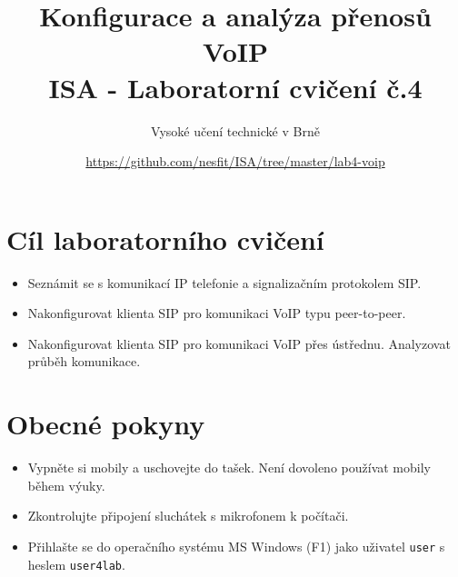 \documentclass[a4paper,11pt]{article}
\title{Konfigurace a analýza přenosů VoIP\\
{\bf\large ISA - Laboratorní cvičení č.4}}
\author{Vysoké učení technické v Brně}
\date{\url{https://github.com/nesfit/ISA/tree/master/lab4-voip}}
\begin{document}
{\let\newpage\relax\maketitle}
\section*{Cíl laboratorního cvičení}
\begin{itemize}
  \item Seznámit se s komunikací IP telefonie a signalizačním protokolem SIP.
  \item Nakonfigurovat klienta SIP pro komunikaci VoIP typu peer-to-peer.
  \item Nakonfigurovat klienta SIP pro komunikaci VoIP přes ústřednu. Analyzovat průběh komunikace.
\end{itemize}

\section*{Obecné pokyny}
\begin{itemize}
  \item Vypněte si mobily a uschovejte do tašek. Není dovoleno používat mobily během výuky. 
  \item Zkontrolujte připojení sluchátek s mikrofonem k počítači. 
  \item Přihlašte se do operačního systému MS Windows (F1) jako uživatel {\tt user} s heslem {\tt user4lab}.
\end{itemize}
\vspace{-5mm}
\end{document}
